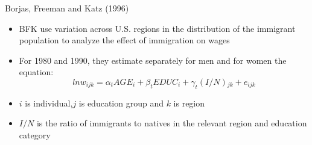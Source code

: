 \documentclass[10pt,hyperref={CJKbookmarks=true},xcolor=dvipsnames,aspectratio=169]{beamer}
\begin{document}
\begin{frame}{Borjas, Freeman and Katz (1996) }

\begin{itemize}
\item BFK use variation across U.S. regions in the distribution of the immigrant
population to analyze the effect of immigration on wages 
\item For 1980 and 1990, they estimate separately for men and for women
the equation: 
\[
lnw_{ijk}=\alpha_{t}AGE_{i}+\beta_{t}EDUC_{i}+\gamma_{t}(I/N){}_{jk}+e_{ijk}
\]

\item $i$ is individual,$j$ is education group and $k$ is region 
\item $I/N$ is the ratio of immigrants to natives in the relevant region
and education category 
\end{itemize}
\end{frame}
\end{document}
